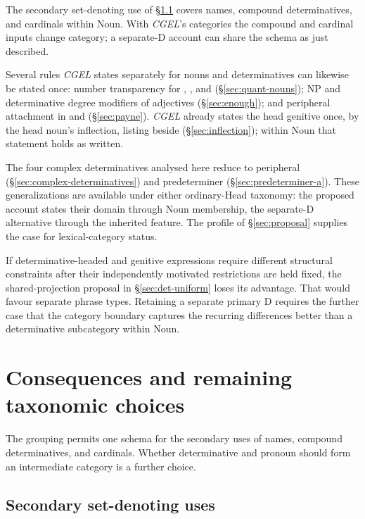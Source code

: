 \documentclass[12pt]{article}
\begin{document}
The secondary set-denoting use of §\ref{sec:secondary-use} covers names, compound determinatives, and cardinals within Noun. With \textit{CGEL}'s categories the compound and cardinal inputs change category; a separate-D account can share the schema as just described.

Several rules \textit{CGEL} states separately for nouns and determinatives can likewise be stated once: number transparency for , , and  (§\ref{sec:quant-nouns}); NP and determinative degree modifiers of adjectives (§\ref{sec:enough}); and peripheral attachment in  and  (§\ref{sec:payne}). \textit{CGEL} already states the head genitive once, by the head noun's inflection, listing  beside  (§\ref{sec:inflection}); within Noun that statement holds as written.

The four complex determinatives analysed here reduce to peripheral  (§\ref{sec:complex-determinatives}) and predeterminer  (§\ref{sec:predeterminer-a}). These generalizations are available under either ordinary-Head taxonomy: the proposed account states their domain through Noun membership, the separate-D alternative through the inherited feature. The profile of §\ref{sec:proposal} supplies the case for lexical-category status.

If determinative-headed and genitive expressions require different structural constraints after their independently motivated restrictions are held fixed, the shared-projection proposal in §\ref{sec:det-uniform} loses its advantage. That would favour separate phrase types. Retaining a separate primary D requires the further case that the category boundary captures the recurring differences better than a determinative subcategory within Noun.

\section{Consequences and remaining taxonomic choices}\label{sec:consequences}

The grouping permits one schema for the secondary uses of names, compound determinatives, and cardinals. Whether determinative and pronoun should form an intermediate category is a further choice.

\subsection{Secondary set-denoting uses}\label{sec:secondary-use}
\end{document}
